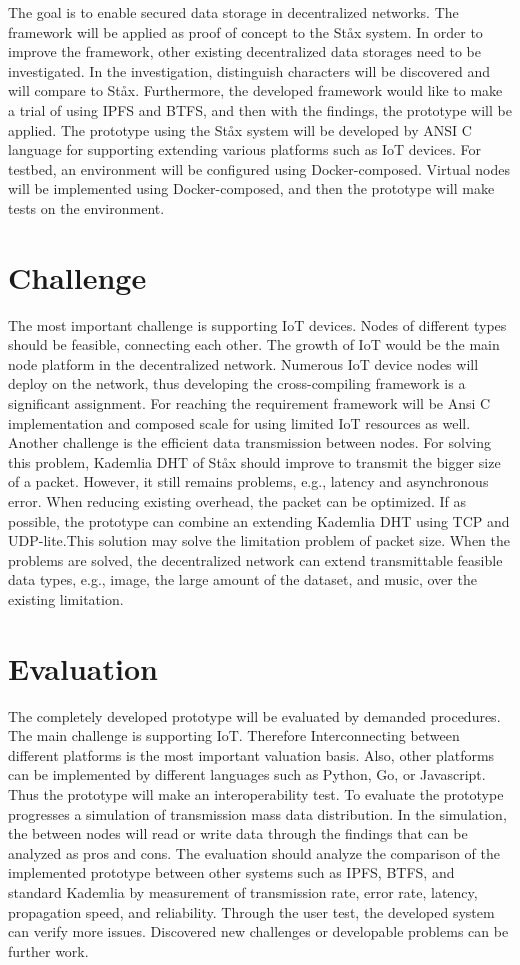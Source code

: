 \documentclass{article}
\begin{document}
The goal is to enable secured data storage in decentralized networks. The framework will be applied as proof of concept to the St\aa x system. In order to improve the framework, other existing decentralized data storages need to be investigated. In the investigation, distinguish characters will be discovered and will compare to St\aa x. Furthermore, the developed framework would like to make a trial of using IPFS and BTFS, and then with the findings, the prototype will be applied. The prototype using the St\aa x system will be developed by ANSI C language for supporting extending various platforms such as IoT devices. For testbed, an environment will be configured using Docker-composed. Virtual nodes will be implemented using Docker-composed, and then the prototype will make tests on the environment.

\section{Challenge}
The most important challenge is supporting IoT devices. Nodes of different types should be feasible, connecting each other. The growth of IoT would be the main node platform in the decentralized network. Numerous IoT device nodes will deploy on the network, thus developing the cross-compiling framework is a significant assignment. For reaching the requirement framework will be Ansi C implementation and composed scale for using limited IoT resources as well. Another challenge is the efficient data transmission between nodes. For solving this problem, Kademlia DHT of St\aa x should improve to transmit the bigger size of a packet. However, it still remains problems, e.g., latency and asynchronous error. When reducing existing overhead, the packet can be optimized. If as possible, the prototype can combine an extending Kademlia DHT using TCP and UDP-lite\cite{rfc3828}.This solution may solve the limitation problem of packet size. When the problems are solved, the decentralized network can extend transmittable feasible data types, e.g., image, the large amount of the dataset, and music, over the existing limitation.

\section{Evaluation}
The completely developed prototype will be evaluated by demanded procedures. The main challenge is supporting IoT. Therefore Interconnecting between different platforms is the most important valuation basis. Also, other platforms can be implemented by different languages such as Python, Go, or Javascript. Thus the prototype will make an interoperability test. To evaluate the prototype progresses a simulation of transmission mass data distribution. In the simulation, the between nodes will read or write data through the findings that can be analyzed as pros and cons. The evaluation should analyze the comparison of the implemented prototype between other systems such as IPFS, BTFS, and standard Kademlia by measurement of transmission rate, error rate, latency, propagation speed, and reliability. Through the user test, the developed system can verify more issues. Discovered new challenges or developable problems can be further work.
\end{document}
